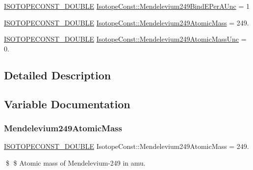 \begin{DoxyCompactItemize}
\item 
\mbox{\hyperlink{group___isotope_const-_macros_ga8f45a7272ce02c0b4c65c44636ed719a}{I\+S\+O\+T\+O\+P\+E\+C\+O\+N\+S\+T\+\_\+\+D\+O\+U\+B\+LE}} \mbox{\hyperlink{group___isotope_const-_mendelevium-_md249_gaa47f4ce2a7724bd03008096575b01c70}{Isotope\+Const\+::\+Mendelevium249\+Bind\+E\+Per\+A\+Unc}} = 1
\item 
\mbox{\hyperlink{group___isotope_const-_macros_ga8f45a7272ce02c0b4c65c44636ed719a}{I\+S\+O\+T\+O\+P\+E\+C\+O\+N\+S\+T\+\_\+\+D\+O\+U\+B\+LE}} \mbox{\hyperlink{group___isotope_const-_mendelevium-_md249_gae93db2dabb2d2e71d586601787f9db7c}{Isotope\+Const\+::\+Mendelevium249\+Atomic\+Mass}} = 249.
\item 
\mbox{\hyperlink{group___isotope_const-_macros_ga8f45a7272ce02c0b4c65c44636ed719a}{I\+S\+O\+T\+O\+P\+E\+C\+O\+N\+S\+T\+\_\+\+D\+O\+U\+B\+LE}} \mbox{\hyperlink{group___isotope_const-_mendelevium-_md249_gae620a183d97a90023c760737f9195414}{Isotope\+Const\+::\+Mendelevium249\+Atomic\+Mass\+Unc}} = 0.
\end{DoxyCompactItemize}


\subsection{Detailed Description}


\subsection{Variable Documentation}
\mbox{\label{group___isotope_const-_mendelevium-_md249_gae93db2dabb2d2e71d586601787f9db7c}} 
\subsubsection{\texorpdfstring{Mendelevium249\+Atomic\+Mass}{Mendelevium249AtomicMass}}
{\footnotesize\ttfamily \mbox{\hyperlink{group___isotope_const-_macros_ga8f45a7272ce02c0b4c65c44636ed719a}{I\+S\+O\+T\+O\+P\+E\+C\+O\+N\+S\+T\+\_\+\+D\+O\+U\+B\+LE}} Isotope\+Const\+::\+Mendelevium249\+Atomic\+Mass = 249.}

\$ \$ Atomic mass of Mendelevium-\/249 in amu. \mbox{\label{group___isotope_const-_mendelevium-_md249_gae620a183d97a90023c760737f9195414}} 
